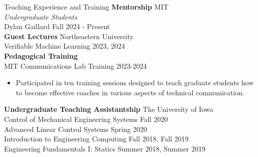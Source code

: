 \begin{rSection}{Teaching Experience and Training}
    {\bf Mentorship} \hfill MIT\\
    \textit{Undergraduate Students}\\
    Dylan Gaillard \hfill Fall 2024 - Present\\

    {\bf Guest Lectures} \hfill Northeastern University\\
    Verifiable Machine Learning \hfill 2023, 2024\\

    {\bf Pedagogical Training}\\
    MIT Communications Lab Training \hfill 2023-2024
    \begin{itemize}
        \item Participated in ten training sessions designed to teach graduate students how to become effective coaches in various aspects of technical communication.
    \end{itemize}

    {\bf Undergraduate Teaching Assistantship} \hfill The University of Iowa\\
    Control of Mechanical Engineering Systems \hfill Fall 2020\\
    Advanced Linear Control Systems \hfill Spring 2020\\
    Introduction to Engineering Computing \hfill Fall 2018, Fall 2019\\
    Engineering Fundamentals I: Statics \hfill Summer 2018, Summer 2019\\

\end{rSection}